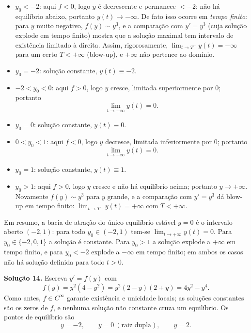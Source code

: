\begin{itemize}
\item $y_0<-2$: aqui $f<0$, logo $y$ é decrescente e permanece $<-2$; não há equilíbrio abaixo, portanto $y(t)\to-\infty$. De fato isso ocorre em \emph{tempo finito}: para $y$ muito negativo, $f(y)\sim y^3$, e a comparação com $y'=y^3$ (cuja solução explode em tempo finito) mostra que a solução maximal tem intervalo de existência limitado à direita. Assim, rigorosamente, $\displaystyle\lim_{t\to T^-}y(t)=-\infty$ para um certo $T<+\infty$ (blow-up), e $+\infty$ não pertence ao domínio.

\item $y_0=-2$: solução constante, $y(t)\equiv-2$.

\item $-2<y_0<0$: aqui $f>0$, logo $y$ cresce, limitada superiormente por $0$; portanto
\[
\lim_{t\to+\infty}y(t)=0 .
\]

\item $y_0=0$: solução constante, $y(t)\equiv0$.

\item $0<y_0<1$: aqui $f<0$, logo $y$ decresce, limitada inferiormente por $0$; portanto
\[
\lim_{t\to+\infty}y(t)=0 .
\]

\item $y_0=1$: solução constante, $y(t)\equiv1$.

\item $y_0>1$: aqui $f>0$, logo $y$ cresce e não há equilíbrio acima; portanto $y\to+\infty$. Novamente $f(y)\sim y^3$ para $y$ grande, e a comparação com $y'=y^3$ dá blow-up em tempo finito: $\displaystyle\lim_{t\to T^-}y(t)=+\infty$ com $T<+\infty$.
\end{itemize}

\medskip\noindent
Em resumo, a bacia de atração do único equilíbrio estável $y=0$ é o intervalo aberto $(-2,1)$: para todo $y_0\in(-2,1)$ tem-se $\lim_{t\to+\infty}y(t)=0$. Para $y_0\in\{-2,0,1\}$ a solução é constante. Para $y_0>1$ a solução explode a $+\infty$ em tempo finito, e para $y_0<-2$ explode a $-\infty$ em tempo finito; em ambos os casos não há solução definida para todo $t>0$.

\bigskip\noindent\textbf{Solução 14.}\quad
Escreva $y'=f(y)$ com
\[
f(y)=y^2(4-y^2)=y^2(2-y)(2+y)=4y^2-y^4 .
\]
Como antes, $f\in C^\infty$ garante existência e unicidade locais; as soluções constantes são os zeros de $f$, e nenhuma solução não constante cruza um equilíbrio. Os pontos de equilíbrio são
\[
y=-2,\qquad y=0\ (\text{raiz dupla}),\qquad y=2 .
\]

